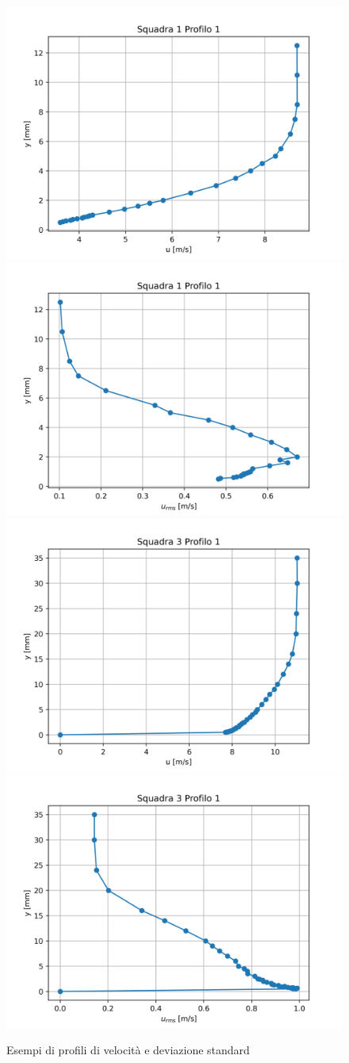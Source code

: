 \begin{figure}[H]
    \centering
    \includegraphics[width=.49\textwidth]{images/9/sq1p1.png}
    \includegraphics[width=.49\textwidth]{images/9/sq1p1rms.png}
    \includegraphics[width=.49\textwidth]{images/9/sq3p1.png}
    \includegraphics[width=.49\textwidth]{images/9/sq3p1rms.png}
    \caption{Esempi di profili di velocità e deviazione standard}
\end{figure}

